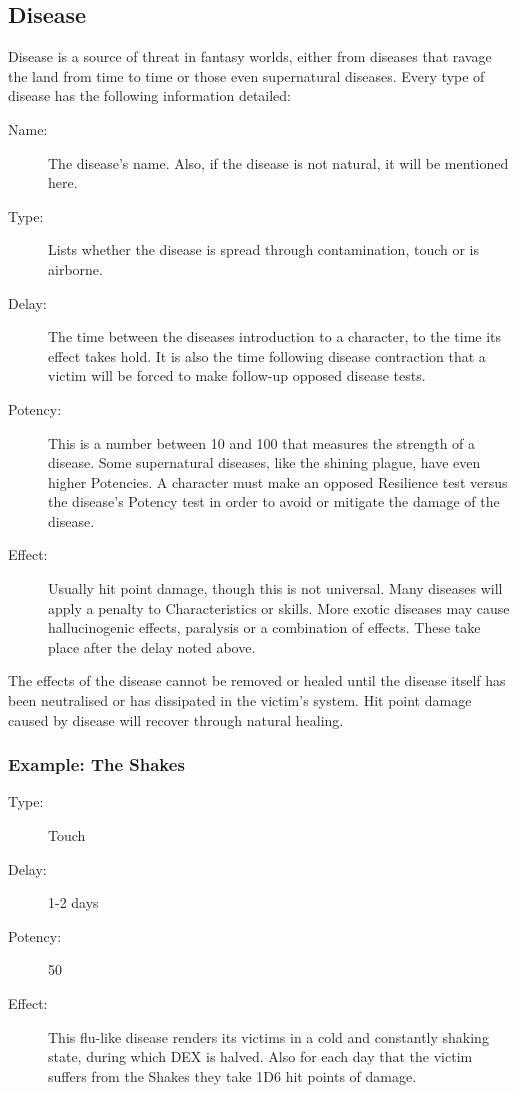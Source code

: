 \subsection{Disease}
\label{ssec:disease}
Disease is a source of threat in fantasy worlds, either from diseases that ravage the land from time to time or those even supernatural diseases.
Every type of disease has the following information detailed: 

\begin{description}
	\item[Name:] The disease’s name. Also, if the disease is not natural, it will be mentioned here. 
	\item[Type:] Lists whether the disease is spread through contamination, touch or is airborne. 
	\item[Delay:] The time between the diseases introduction to a character, to the time its effect takes hold. It is also the time following disease contraction that a victim will be forced to make follow-up opposed disease tests.
	\item[Potency:] This is a number between 10 and 100 that measures the strength of a disease. Some supernatural diseases, like the shining plague, have even higher Potencies. A character must make an opposed Resilience test versus the disease’s Potency test in order to avoid or mitigate the damage of the disease.
	\item[Effect:] Usually hit point damage, though this is not universal. Many diseases will apply a penalty to Characteristics or skills. More exotic diseases may cause hallucinogenic effects, paralysis or a combination of effects. These take place after the delay noted above. 
\end{description}

The effects of the disease cannot be removed or healed until the disease itself has been neutralised or has dissipated in the victim’s system. Hit point damage caused by disease will recover through natural healing.

\subsubsection{Example: The Shakes}

\begin{description}
\item[Type:] Touch
\item[Delay:] 1-2 days
\item[Potency:] 50
\item[Effect:] This flu-like disease renders its victims in a cold and constantly shaking state, during which DEX is halved. Also for each day that the victim suffers from the Shakes they take 1D6 hit points of damage.
\end{description}

